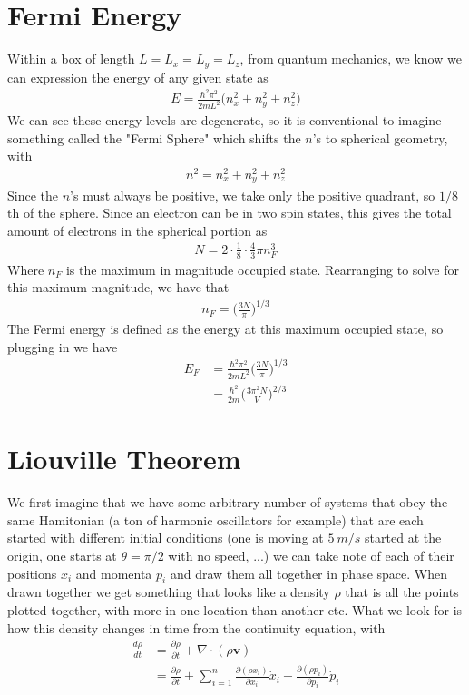 \section{Fermi Energy}
Within a box of length $L = L_x = L_y = L_z$, from quantum mechanics, we know we can expression the energy of any given state as
\begin{align}
E = \frac{\hbar^2\pi^2}{2mL^2}\Big(n_x^2+n_y^2+n_z^2\Big)
\end{align}
We can see these energy levels are degenerate, so it is conventional to imagine something called the "Fermi Sphere" which shifts the $n$'s to spherical geometry, with
\begin{align}
n^2 = n_x^2 + n_y^2+n_z^2
\end{align}
Since the $n$'s must always be positive, we take only the positive quadrant, so $1/8$th of the sphere. Since an electron can be in two spin states, this gives the total amount of electrons in the spherical portion as
\begin{align}
N = 2\cdot\frac{1}{8}\cdot\frac{4}{3}\pi n_F^3
\end{align}
Where $n_F$ is the maximum in magnitude occupied state.
Rearranging to solve for this maximum magnitude, we have that
\begin{align}
n_F = \Big(\frac{3N}{\pi}\Big)^{1/3}
\end{align}
The Fermi energy is defined as the energy at this maximum occupied state, so plugging in we have
\begin{align}
E_F &= \frac{\hbar^2\pi^2}{2mL^2}\Big(\frac{3N}{\pi}\Big)^{1/3}\\
&=\frac{\hbar^2}{2m}\Big(\frac{3\pi^2N}{V}\Big)^{2/3}
\end{align}


\section{Liouville Theorem}
We first imagine that we have some arbitrary number of systems that obey the same Hamitonian (a ton of harmonic oscillators for example) that are each started with different initial conditions (one is moving at $5~m/s$ started at the origin, one starts at $\theta = \pi/2$ with no speed, ...) we can take note of each of their positions $x_i$ and momenta $p_i$ and draw them all together in phase space. When drawn together we get something that looks like a density $\rho$ that is all the points plotted together, with more in one location than another etc. What we look for is how this density changes in time from the continuity equation, with
\begin{align}
\frac{d\rho}{dt} &= \frac{\partial\rho}{\partial t} + \nabla\cdot(\rho\textbf{v})\\
&=\frac{\partial\rho}{\partial t} + \sum_{i=1}^n \frac{\partial (\rho x_i)}{\partial x_i}\dot{x}_i + \frac{\partial (\rho p_i)}{\partial p_i}\dot{p}_i
\end{align}




